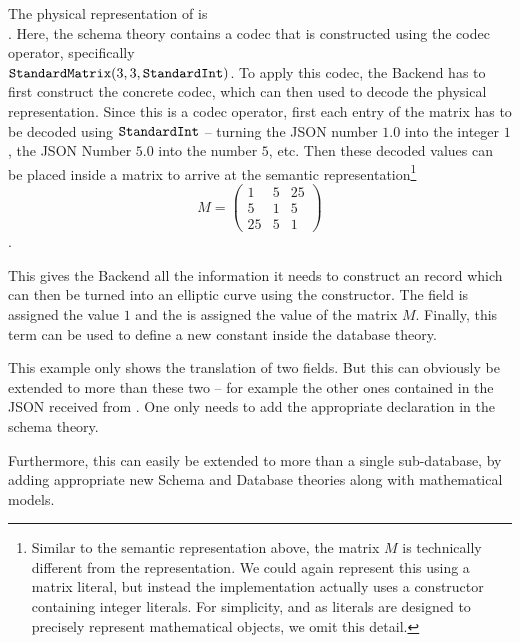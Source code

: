 The physical representation of  is \\\inlinecode{[[1.0,5.0,25.0],[5.0,1.0,5.0],[25.0,5.0,1.0]]}. 
Here, the schema theory contains a codec that is constructed using the  codec operator, specifically \\$\plaintt{StandardMatrix}(3, 3, \plaintt{StandardInt})$. 
To apply this codec, the Backend has to first construct the concrete codec, which can then used to decode the physical representation. 
Since this is a codec operator, first each entry of the matrix has to be decoded using $\plaintt{StandardInt}$ -- turning the JSON number $1.0$ into the integer $1$, the JSON Number $5.0$ into the number $5$, etc. 
Then these decoded values can be placed inside a matrix to arrive at the semantic representation\footnote{
  Similar to the semantic representation above, the matrix $M$ is technically different from the \ommt representation. 
  We could again represent this using a matrix literal, but instead the implementation actually uses a constructor containing integer literals. 
  For simplicity, and as literals are designed to precisely represent mathematical objects, we omit this detail. 
} $$M = \left( \begin{array}{ccc}
1 & 5 & 25 \\
5 & 1 & 5 \\
25 & 5 & 1 \end{array} \right) $$. 

This gives the Backend all the information it needs to construct an \mmt record which can then be turned into an elliptic curve using the  constructor. 
The  field is assigned the value $1$ and the  is assigned the value of the matrix $M$. 
Finally, this \mmt term can be used to define a new constant inside the database theory. 

This example only shows the translation of two fields. 
But this can obviously be extended to more than these two -- for example the other ones contained in the JSON received from \lmfdb. 
One only needs to add the appropriate declaration in the schema theory. 

Furthermore, this can easily be extended to more than a single \lmfdb sub-database, by adding appropriate new Schema and Database theories along with mathematical models. 



